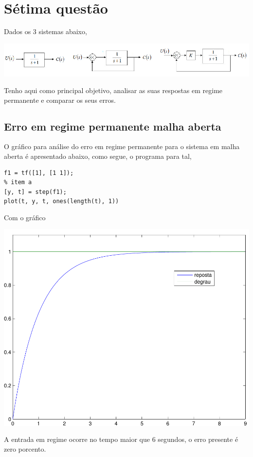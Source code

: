 \documentclass[paper=a4, fontsize=11pt]{article}
\begin{document}
\section{Sétima questão}

Dados os 3 sistemas abaixo,

\begin{center}
    \includegraphics[scale=0.5]{q7.png}
\end{center}

Tenho aqui como principal objetivo, analisar as suas respostas em regime permanente
e comparar os seus erros.

\subsection{Erro em regime permanente malha aberta}

O gráfico para análise do erro em regime permanente para o sistema em malha aberta
é apresentado abaixo, como segue, o programa para tal,

\begin{lstlisting}
f1 = tf([1], [1 1]);
% item a
[y, t] = step(f1);
plot(t, y, t, ones(length(t), 1))
\end{lstlisting}
 
Com o gráfico

\begin{center}
    \includegraphics[scale=0.5]{q7ia.pdf}
\end{center}

A entrada em regime ocorre no tempo maior que 6 segundos, o erro presente é zero porcento.
\end{document}
